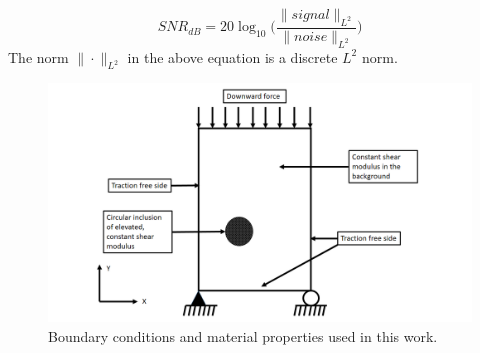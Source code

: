 \documentclass[12pt]{article}
\begin{document}
\begin{equation}
  \label{eqn:snr}
  SNR_{dB} = 20\log_{10}\Big(\frac{\|signal\|_{L^2}}{\|noise\|_{L^2}}\Big)
\end{equation}
The norm $\|\cdot\|_{L^2}$ in the above equation is a discrete $L^2$ norm. 
%
\begin{figure}[h] 
   \centering
    \includegraphics[totalheight=9cm]{Figures/bc.png}
  \caption{\label{fig:bc}Boundary conditions and material properties used in this work. }
\end{figure}
%
\end{document}
